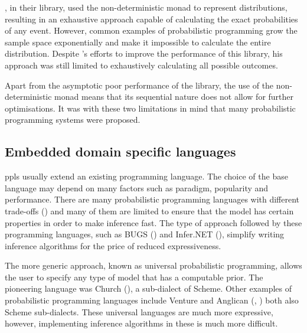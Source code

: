 \documentclass[
  oneside,
  11pt, a4paper,
  footinclude=true,
  headinclude=true,
  cleardoublepage=empty
]{scrbook}
\theoremstyle{definition}
\theoremstyle{definition}
\begin{document}
         \cite {erwig_kollmansberger_2006}, in their library, used the non-deterministic monad to represent distributions, resulting in an exhaustive approach capable of calculating the exact probabilities of any event. However, common examples of probabilistic programming grow the sample space exponentially and make it impossible to calculate the entire distribution. Despite \cite{larsen2011memory} 's efforts to improve the performance of this library, his approach was still limited to exhaustively calculating all possible outcomes.
                
         Apart from the asymptotic poor performance of the \cite{erwig_kollmansberger_2006} library, the use of the non-deterministic monad means that its sequential nature does not allow for further optimisations. It was with these two limitations in mind that many probabilistic programming systems were proposed.
        
        \subsection{Embedded domain specific languages}
        
        \gls{ppl}s usually extend an existing programming language. The choice of the base language may depend on many factors such as paradigm, popularity and performance. There are many probabilistic programming languages ​​with different trade-offs (\cite{Scibior:2015:PPP:2887747.2804317}) and many of them are limited to ensure that the model has certain properties in order to make inference fast. The type of approach followed by these programming languages, such as BUGS (\cite{gilks1994language}) and Infer.NET (\cite{minkainfer}), simplify writing inference algorithms for the price of reduced expressiveness.
        
        The more generic approach, known as universal probabilistic programming, allows the user to specify any type of model that has a computable prior. The pioneering language was Church (\cite{goodman2012church}), a sub-dialect of Scheme. Other examples of probabilistic programming languages include Venture and Anglican (\cite{mansinghka2014venture}, \cite{tolpin2015probabilistic}) both also Scheme sub-dialects. These universal languages are much more expressive, however, implementing inference algorithms in these is much more difficult.
                
\end{document}
